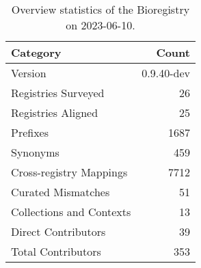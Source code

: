 \begin{table}
\caption{Overview statistics of the Bioregistry on 2023-06-10.}
\label{tab:bioregistry-summary}
\begin{tabular}{lr}
\toprule
Category & Count \\
\midrule
Version & 0.9.40-dev \\
Registries Surveyed & 26 \\
Registries Aligned & 25 \\
Prefixes & 1687 \\
Synonyms & 459 \\
Cross-registry Mappings & 7712 \\
Curated Mismatches & 51 \\
Collections and Contexts & 13 \\
Direct Contributors & 39 \\
Total Contributors & 353 \\
\bottomrule
\end{tabular}
\end{table}
